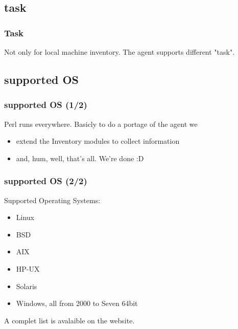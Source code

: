 \subsection{task}
\begin{frame}
\frametitle{Task}
%
Not only for local machine inventory. The agent supports different "task".
\end{frame}



\subsection{supported OS}
\begin{frame}
\frametitle{supported OS (1/2)}
Perl runs everywhere.
\pause
Basicly to do a portage of the agent we
\begin{itemize}
%
\item extend the Inventory modules to collect information
\item and, hum, well, that's all. We're done :D
%
\end{itemize}

\end{frame}
\begin{frame}
\frametitle{supported OS (2/2)}
Supported Operating Systems:
\begin{itemize}
%
\item Linux
\pause
\item BSD
\pause
\item AIX
\pause
\item HP-UX
\pause
\item Solaris
\pause
\item Windows, all from 2000 to Seven 64bit
%
\end{itemize}
A complet list is avalaible on the website.
\end{frame}

